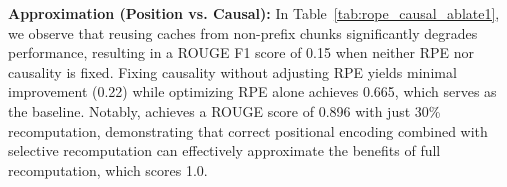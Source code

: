 


\textbf{Approximation (Position vs. Causal):} 
In Table~\ref{tab:rope_causal_ablate1}, we observe that reusing caches from non-prefix chunks significantly degrades performance, resulting in a ROUGE F1 score of 0.15 when neither RPE nor causality is fixed. Fixing causality without adjusting RPE yields minimal improvement (0.22) while optimizing RPE alone achieves 0.665, which serves as the \fullcache baseline. Notably, \sys achieves a ROUGE score of 0.896 with just 30\% recomputation, demonstrating that correct positional encoding combined with selective recomputation can effectively approximate the benefits of full recomputation, which scores 1.0.

